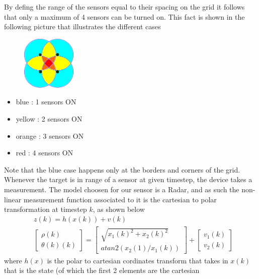 \documentclass[twocolumn]{article}
\begin{document}
    By defing the range of the sensors equal to their spacing on the grid it follows that only a maximum of 4 sensors can be turned on. 
    This fact is shown in the following picture that illustrates the different cases
    \begin{figure}[h!]
        \centering
        \includegraphics[width=0.23\textwidth]{Immagini/4sensor.png}
        \caption{}
        \label{fig:number}
    \end{figure}
    \begin{itemize}
        \item blue : 1 sensors ON
        \item yellow : 2 sensors ON 
        \item orange : 3 sensors ON 
        \item red : 4 sensors ON 
    \end{itemize}
    Note that the blue case happens only at the borders and corners of the grid.
    \\
    Whenever the target is in range of a sensor at given timestep, the device takes a measurement.
    The model choosen for our sensor is a Radar, and as such the non-linear measurement function
     associated to it is the cartesian to polar transformation at timestep $k$, as shown below
    \begin{align*}
        &z(k)=h(x(k))+v(k)\\
        &\begin{bmatrix}
            \rho(k)\\ \theta (k)(k)
        \end{bmatrix}=  
        \begin{bmatrix}
            \sqrt{x_{1}(k)^2+x_{2}(k)^2}\\ atan2(x_{2}(1)/x_{1}(k))
        \end{bmatrix} +
        \begin{bmatrix}
            v_{1}(k)\\v_{2}(k)
        \end{bmatrix}
    \end{align*}
    where $h(x)$ is the polar to cartesian cordinates transform that takes in $x(k)$ that is the state (of which the first 2 elements are the cartesian
\end{document}
